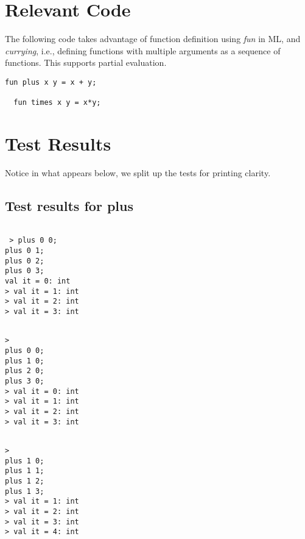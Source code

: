 \documentclass{report}
\begin{document}
\section{Relevant Code}
\label{sec:relevant-code}

The following code takes advantage of function definition using
\emph{fun} in ML, and \emph{currying}, i.e., defining functions with
multiple arguments as a sequence of functions.  This supports partial
evaluation.

\lstset{frameround=fttt}
\begin{lstlisting}[frame=trBL]
  fun plus x y = x + y;

  fun times x y = x*y;
\end{lstlisting}

\section{Test Results}
\label{sec:tests}

Notice in what appears below, we split up the tests for printing
clarity.
\subsection{Test results for plus}
\label{sec:test-results-plus}

\setcounter{sessioncount}{0}
\begin{session}
  \begin{scriptsize}
\begin{verbatim}

 > plus 0 0;
plus 0 1;
plus 0 2;
plus 0 3;
val it = 0: int
> val it = 1: int
> val it = 2: int
> val it = 3: int
\end{verbatim}
  \end{scriptsize}
\end{session}


\begin{session}
  \begin{scriptsize}
\begin{verbatim}

> 
plus 0 0;
plus 1 0;
plus 2 0;
plus 3 0;
> val it = 0: int
> val it = 1: int
> val it = 2: int
> val it = 3: int
\end{verbatim}
  \end{scriptsize}
\end{session}

\begin{session}
  \begin{scriptsize}
\begin{verbatim}

> 
plus 1 0;
plus 1 1;
plus 1 2;
plus 1 3;
> val it = 1: int
> val it = 2: int
> val it = 3: int
> val it = 4: int
\end{verbatim}
  \end{scriptsize}
\end{session}
\end{document}
